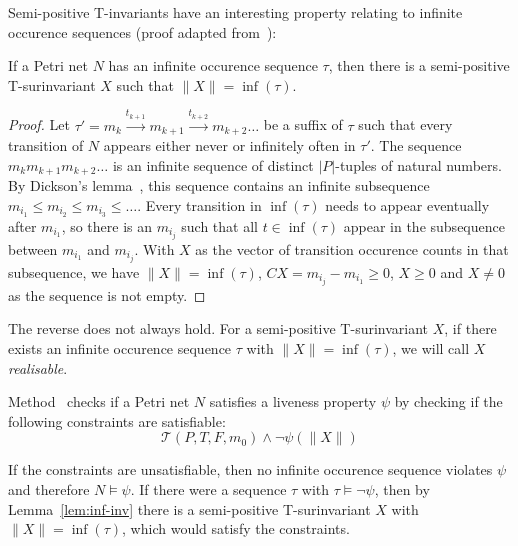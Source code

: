 Semi-positive T-invariants have an interesting property relating to infinite
occurence sequences (proof adapted from~\cite{EsparzaBruns96}):
\begin{lemma}
\label{lem:inf-inv}
    If a Petri net $N$ has an infinite occurence sequence $\tau$, then
    there is a semi-positive T-surinvariant $X$ such that
    $\|X\| = \inf(\tau)$.
\end{lemma}
\begin{proof}
    Let $\tau' = m_k \xrightarrow{t_{k+1}} m_{k+1} \xrightarrow{t_{k+2}} m_{k+2} \ldots$ be
    a suffix of $\tau$ such that every transition of $N$ appears either
    never or infinitely often in $\tau'$. The sequence $m_k m_{k+1} m_{k+2} \ldots$
    is an infinite sequence of distinct $|P|$-tuples of natural numbers.
    By Dickson's lemma~\cite{Dickson13}, this sequence contains an
    infinite subsequence $m_{i_1} \le m_{i_2} \le m_{i_3} \le \ldots$.
    Every transition in $\inf(\tau)$ needs to appear eventually after
    $m_{i_1}$, so there is an $m_{i_j}$ such that all $t \in \inf(\tau)$
    appear in the subsequence between $m_{i_1}$ and $m_{i_j}$. With
    $X$ as the vector of transition occurence counts in that subsequence,
    we have $\|X\| = \inf(\tau)$, $C X = m_{i_j} - m_{i_1} \ge 0$,
    $X \ge 0$ and $X \ne 0$ as the sequence is not empty.
\end{proof}
The reverse does not always hold. For a semi-positive T-surinvariant $X$,
if there exists an infinite occurence sequence $\tau$ with $\|X\| = \inf(\tau)$,
we will call $X$ \emph{realisable}.

Method \liveness\ checks if a Petri net $N$ satisfies a liveness
property $\psi$ by checking if the following constraints are satisfiable:
\begin{equation}\label{eq:liveness}
  \mathcal{T}(P, T, F, m_0) \land \neg\psi(\|X\|)
\end{equation}

If the constraints are unsatisfiable, then no infinite occurence
sequence violates $\psi$ and therefore $N \models \psi$.
If there were a sequence $\tau$ with $\tau \models \neg\psi$,
then by Lemma~\ref{lem:inf-inv} there is a semi-positive T-surinvariant
$X$ with $\|X\| = \inf(\tau)$, which would satisfy the constraints.


